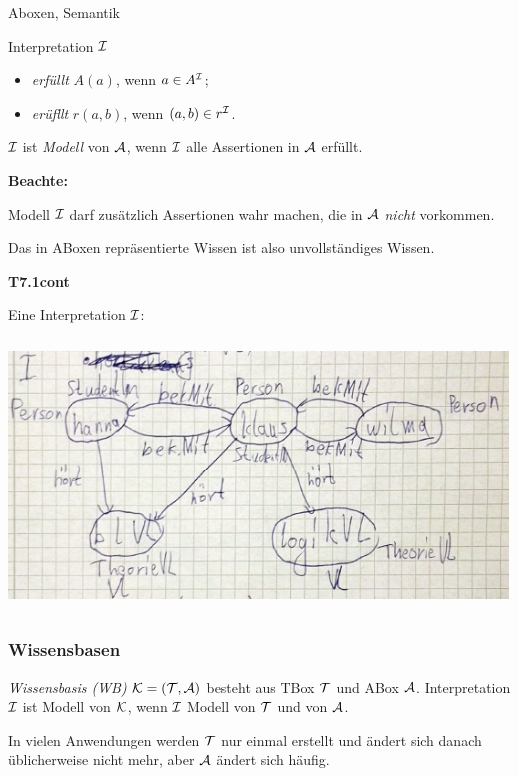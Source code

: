 \begin{definition}{Aboxen, Semantik}

Interpretation $\mathcal{I}$

\begin{itemize}
	\item \emph{erfüllt} $A(a)$, wenn $a \in A^{\mathcal{I}}$;
	\item \emph{erüfllt} $r(a,b)$, wenn $(a,b) \in r^{\mathcal{I}}$.
\end{itemize}

$\mathcal{I}$ ist \emph{Modell} von $\mathcal{A}$, wenn $\mathcal{I}$ alle Assertionen in $\mathcal{A}$ erfüllt.
\end{definition}

\textbf{Beachte:}

Modell $\mathcal{I}$ darf zusätzlich Assertionen wahr machen, die in $\mathcal{A}$ \emph{nicht} vorkommen.

Das in ABoxen repräsentierte Wissen ist also unvollständiges Wissen.

\textbf{T7.1cont}

Eine Interpretation $\mathcal{I}$:

\includegraphics[width=5.21910in,height=2.83200in]{media/71abox.png}

\subsubsection{Wissensbasen}

\begin{definition}

\emph{Wissensbasis (WB)} $\mathcal{K} = (\mathcal{T} , \mathcal{A})$ besteht aus TBox $\mathcal{T}$ und ABox $\mathcal{A}$. Interpretation $\mathcal{I}$ ist Modell von $\mathcal{K}$, wenn $\mathcal{I}$ Modell von $\mathcal{T}$ und von $\mathcal{A}$.
\end{definition}

In vielen Anwendungen werden $\mathcal{T}$ nur einmal erstellt und ändert sich danach üblicherweise nicht mehr, aber $\mathcal{A}$ ändert sich häufig.

